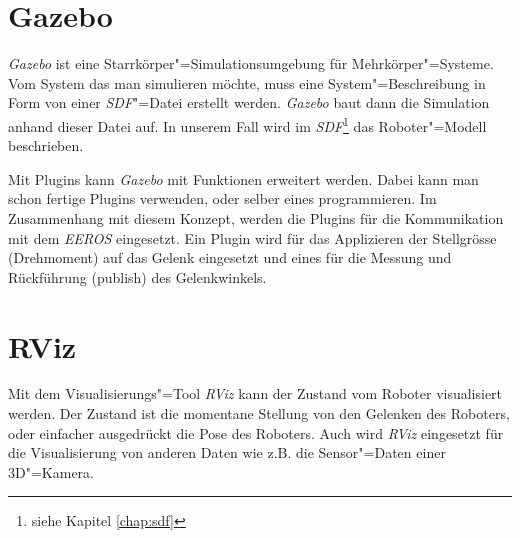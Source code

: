 %	
%	
%	
%	
%
% 	
% 
%
%
%	
%
%

\section{Gazebo}
\label{chap:gazebo}
\textit{Gazebo} ist eine Starrkörper"=Simulationsumgebung für Mehrkörper"=Systeme.
Vom System das man simulieren möchte, muss eine System"=Beschreibung in Form von einer \textit{SDF}"=Datei erstellt werden.
\textit{Gazebo} baut dann die Simulation anhand dieser Datei auf. 
In unserem Fall wird im \textit{SDF}\footnote{siehe Kapitel \ref{chap:sdf}} das Roboter"=Modell beschrieben.

Mit Plugins kann \textit{Gazebo} mit Funktionen erweitert werden.
Dabei kann man schon fertige Plugins verwenden, oder selber eines programmieren.
Im Zusammenhang mit diesem Konzept, werden die Plugins für die Kommunikation mit dem \textit{EEROS} eingesetzt.
Ein Plugin wird für das Applizieren der Stellgrösse (Drehmoment) auf das Gelenk eingesetzt und eines für die Messung und Rückführung (publish) des Gelenkwinkels.


\section{RViz}
\label{chap:rviz}
Mit dem Visualisierungs"=Tool \textit{RViz} kann der Zustand vom Roboter visualisiert werden.
Der Zustand ist die momentane Stellung von den Gelenken des Roboters, oder einfacher ausgedrückt die Pose des Roboters.
Auch wird \textit{RViz} eingesetzt für die Visualisierung von anderen Daten wie z.B. die Sensor"=Daten einer 3D"=Kamera.


